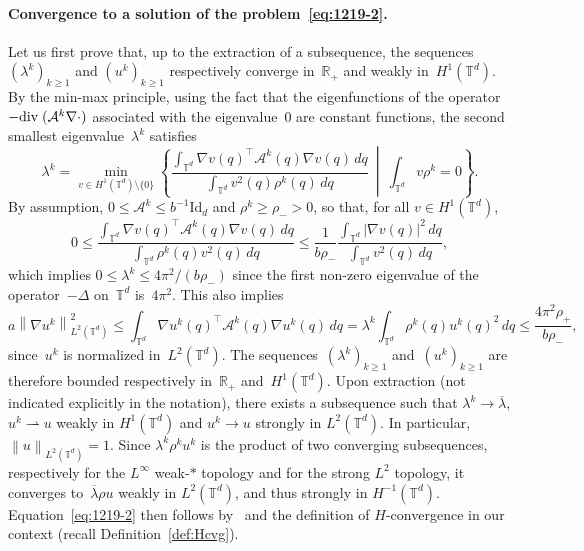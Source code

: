 \documentclass{article}
\newcommand{\dps}{\displaystyle }
\newcommand{\R}{\mathbb{R}}
\newcommand{\Id}{\mathrm{Id}}
\renewcommand{\leq}{\leqslant}
\renewcommand{\geq}{\geqslant}
\def\div{{\rm div \;}}
\def\R{\mathbb{R}}
\def\T{\mathbb{T}}
\newcommand{\A}{\mathcal{A}}
\renewcommand{\dim}{d}
\begin{document}
\paragraph{Convergence to a solution of the problem~\eqref{eq:1219-2}.}
Let us first prove that, up to the extraction of a subsequence, the sequences $(\lambda^k)_{k \geq 1}$ and $(u^k)_{k \geq 1}$ respectively converge in~$\R_+$ and weakly in~$H^1(\T^\dim)$. By the min-max principle, using the fact that the eigenfunctions of the operator~$-\div(\A^k\nabla \cdot)$ associated with the eigenvalue~0 are constant functions, 
the second smallest eigenvalue~$\lambda^k$ satisfies
\[
\lambda^k = \min_{v \in H^1(\T^\dim) \setminus \{0\}} \left\{ \frac{\dps \int_{\T^\dim} \nabla v(q)^\top \A^k(q)\nabla v(q) \, dq}{\dps \int_{\T^\dim}v^2(q) \rho^k(q) \, dq} \ \middle| \ \int_{\T^\dim} v \rho^k = 0 \right\}.
\]
By assumption, $0 \leq \A^k \leq b^{-1} \Id_\dim$ and $\rho^k \geq \rho_- >0$, so that, for all $v\in H^1(\T^\dim)$, 
\[
0 \leq \frac{\dps \int_{\T^\dim} \nabla v(q)^\top \A^k(q)\nabla v(q)\,dq}{\dps \int_{\T^\dim}\rho^k(q)v^2(q)\,dq} \leq \frac{1}{b \rho_-} \frac{\dps \int_{\T^\dim} |\nabla v(q)|^2 \, dq}{\dps \int_{\T^\dim} v^2(q) \, dq},
\]
which implies $0 \leq \lambda^k \leq 4\pi^2/ (b \rho_-)$ since the first non-zero eigenvalue of the operator~$-\Delta$ on~$\T^\dim$ is~$4\pi^2$. This also implies
\[
a \left\|\nabla u^k \right\|_{L^2(\T^\dim)}^2 \leq \int_{\T^\dim} \nabla u^k(q)^\top \A^k(q)\nabla u^k(q)\,dq = \lambda^k \int_{\T^\dim} \rho^k(q) u^k(q)^2 \, dq \leq \frac{4\pi^2 \rho_+}{b \rho_-},
\]
since~$u^k$ is normalized in~$L^2(\T^\dim)$. The sequences~$(\lambda^k)_{k \geq 1}$ and~$(u^k)_{k\geq 1}$ are therefore bounded respectively in~$\R_+$ and~$H^1(\T^\dim)$. Upon extraction (not indicated explicitly in the notation), there exists a subsequence such that $\lambda^k \to \overline{\lambda}$, $u^k \rightharpoonup u$ weakly in $H^1(\T^\dim)$ and $u^k \to u$ strongly in $L^2(\T^\dim)$. In particular, $\left\| u \right\|_{L^2(\T^\dim)} = 1$. Since $\lambda^k \rho^k u^k$ is the product of two converging subsequences, respectively for the $L^{\infty}$ weak-$*$ topology and for the strong $L^2$ topology, it converges to~$\overline{\lambda}\rho u$ weakly in $L^2(\T^\dim)$, and thus strongly in $H^{-1}(\T^\dim)$. Equation~\eqref{eq:1219-2} then follows by~\cite[Proposition 1.2.19]{allaire_homogeneisation} and the definition of $H$-convergence in our context (recall Definition~\ref{def:Hcvg}).
\end{document}
